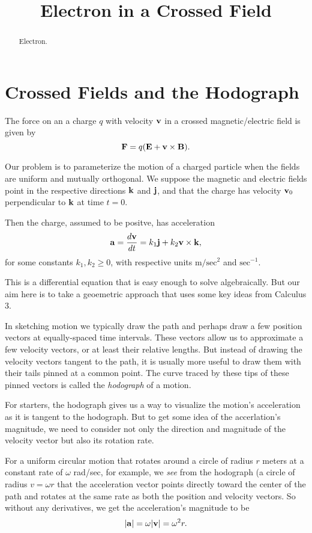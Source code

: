 \documentclass{ximera}
\title{Electron in a Crossed Field}
\begin{document}
\begin{abstract}
Electron.
\end{abstract}
\maketitle

\section*{Crossed Fields and the Hodograph}

The force on an a charge $q$ with velocity ${\bf v}$ in a crossed magnetic/electric field is given by
\[
     {\bf F} = q ({\bf E} + {\bf v}\times {\bf B} ) .
\]

Our problem is to parameterize the motion of a charged particle when the fields are uniform and mutually orthogonal. We suppose the magnetic and electric fields point in the respective directions ${\bf k}$ and ${\bf j}$, and that the charge has velocity ${\bf v}_0$ perpendicular to ${\bf k}$ at time $t=0$.

Then the charge, assumed to be positve, has acceleration
\[
    {\bf a} =  \frac{d {\bf v}}{dt} = k_1 {\bf j} + k_2 {\bf v}\times {\bf k} ,
\]
for some constants $k_1, k_2 \geq 0$, with respective units $\text{m}/\text{sec}^2$ and $\text{sec}^{-1}$.

This is a differential equation that is easy enough to solve algebraically. But our aim here is to take a geoemetric approach that uses some key ideas from Calculus 3. 

In sketching motion we typically draw the path and perhaps draw a few position vectors at equally-spaced time intervals. These vectors allow us to approximate a few velocity vectors, or at least their relative lengths. But instead of drawing the velocity vectors tangent to the path, it is usually more useful to draw them with their tails pinned at a common point. The curve traced by these tips of these pinned vectors is called the \emph{hodograph} of a motion. 

For starters, the hodograph gives us a way to visualize the motion's acceleration as it is tangent to the hodograph. But to get some idea of the accerlation's magnitude, we need to consider not only the direction and magnitude of the velocity vector but also its rotation rate. 

For a uniform circular motion that rotates around a circle of radius $r$ meters at a constant rate of $\omega$ rad/sec, for example,  we \emph{see} from the hodograph (a circle of radius $v = \omega r$ that the acceleration vector points directly toward the center of the path and rotates at the same rate as both the position and velocity vectors. So without any derivatives, we get the acceleration's magnitude to be
\[
    | {\bf a}| = \omega |{\bf v}| = \omega^2 r .
\]
\end{document}
